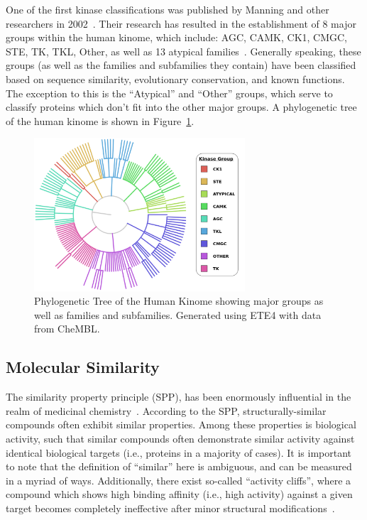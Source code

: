 \documentclass[11pt]{article}
\begin{document}
One of the first kinase classifications was published by Manning and other researchers in 2002~\cite{manning_2002}. 
Their research has resulted in the establishment of 8 major groups within the human kinome, which include: AGC, CAMK, CK1, CMGC, STE, TK, TKL, Other, as well as 13 atypical families~\cite{eid_turk_volkamer_rippmann_fulle_2017}.
Generally speaking, these groups (as well as the families and subfamilies they contain) have been classified based on sequence similarity, evolutionary conservation, and known functions. The exception to this is the ``Atypical'' and ``Other'' groups, which serve to classify proteins which don't fit into the other major groups. 
A phylogenetic tree of the human kinome is shown in Figure~\ref{fig:fam_tree}. %

\begin{figure}[H]
    \centering
    \includegraphics[width=0.7\textwidth]{../figures/protein_family_tree.png}
    \caption{Phylogenetic Tree of the Human Kinome showing major groups as well as families and subfamilies. Generated using ETE4 with data from CheMBL.}
    \label{fig:fam_tree}
\end{figure}


\subsection*{Molecular Similarity}
The similarity property principle (SPP), has been enormously influential in the realm of medicinal chemistry~\cite{maggiora_vogt_stumpfe_bajorath_2013}. 
According to the SPP, structurally-similar compounds often exhibit similar properties. 
Among these properties is biological activity, such that similar compounds often demonstrate similar activity against identical biological targets (i.e., proteins in a majority of cases). 
It is important to note that the definition of ``similar'' here is ambiguous, and can be measured in a myriad of ways. 
Additionally, there exist so-called ``activity cliffs'', where a compound which shows high binding affinity (i.e., high activity) against a given target becomes completely ineffective after minor structural modifications~\cite{maggiora_vogt_stumpfe_bajorath_2013,filip_miljkovic_jurgen_bajorath_2018}.  
\end{document}

